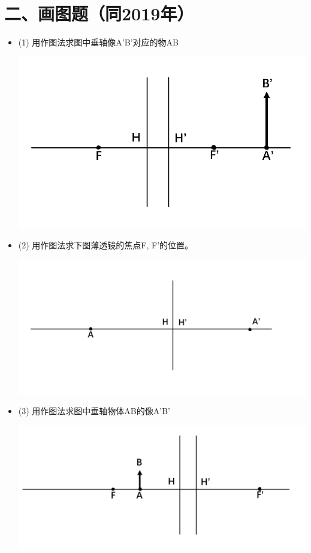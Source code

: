 \documentclass[11pt,a4paper]{article}
\begin{document}
    \section*{二、画图题（同2019年）}
    \begin{itemize}
        \item (1) 用作图法求图中垂轴像A'B'对应的物AB
        
        \includegraphics[scale=0.2]{1.png}%
        \vspace{-5mm}
        \item (2) 用作图法求下图薄透镜的焦点F, F'的位置。
         
        \includegraphics[scale=0.2]{2.png}%
        \vspace{-5mm}
        \item (3) 用作图法求图中垂轴物体AB的像A'B'
        
        \includegraphics[scale=0.2]{3.png}%
    \end{itemize}
    \vspace{10mm}
\end{document}
